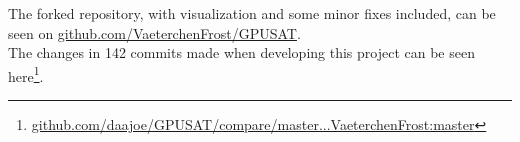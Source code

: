 \documentclass[a4paper, 12pt, bibliography=totoc]{scrartcl}
\begin{document}
The forked repository, with visualization and some minor fixes included, can be seen on \url{github.com/VaeterchenFrost/GPUSAT}. \\
The changes in 142 commits made when developing this project can be seen here\footnote{\url{github.com/daajoe/GPUSAT/compare/master...VaeterchenFrost:master}}.

\end{document}
